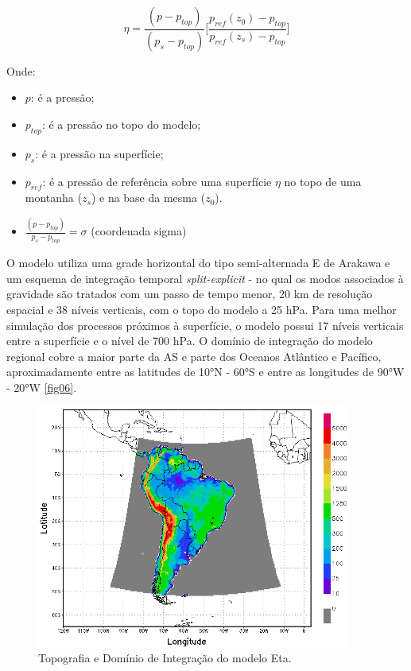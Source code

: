 \begin{equation}
\eta=\frac{(p-p_{top})}{(p_{s}-p_{top})}\bigg[\frac{p_{ref}(z_{0})-p_{top}}{p_{ref}(z_{s})-p_{top}}\bigg]
\label{form04}
\end{equation}

Onde:

\begin{itemize}
\item $p$: é a pressão;
\item $p_{top}$: é a pressão no topo do modelo;
\item $p_{s}$: é a pressão na superfície;
\item $p_{ref}$: é a pressão de referência sobre uma superfície $\eta$ no topo de uma montanha ($z_{s}$) e na base da mesma ($z_{0}$).
\item $\frac{(p-p_{top})}{p_{s}-p_{top}}=\sigma$ (coordenada sigma)
\end{itemize}

O modelo utiliza uma grade horizontal do tipo semi-alternada E de Arakawa \cite{arakawalamb77} e um esquema de integração temporal \textit{split-explicit} - no qual os modos associados à gravidade são tratados com um passo de tempo menor, 20 km de resolução espacial e 38 níveis verticais, com o topo do modelo a 25 hPa. Para uma melhor simulação dos processos próximos à superfície, o modelo possui 17 níveis verticais entre a superfície e o nível de 700 hPa. O domínio de integração do modelo regional cobre a maior parte da AS e parte dos Oceanos Atlântico e Pacífico, aproximadamente entre as latitudes de 10°N - 60°S e entre as longitudes de 90°W - 20°W \autoref{fig06}.

\begin{figure}[!h]
\centering
\includegraphics[height=8cm]{./figs/topo_dom.png}
\caption{Topografia e Domínio de Integração do modelo Eta.}
\label{fig06}
\end{figure}

